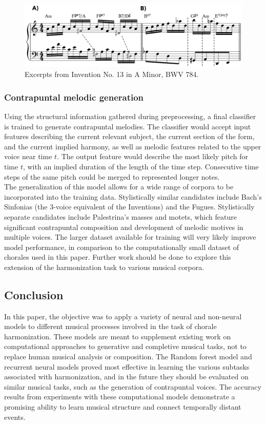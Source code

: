 \documentclass[11pt]{article}
\begin{document}
\begin{figure}[h]
\caption{ Excerpts from Invention No. 13 in A Minor, BWV 784.  }
\centerline{\includegraphics[scale=0.27]{examples/ex2}}
\end{figure}

\subsubsection{Contrapuntal melodic generation}
Using the structural information gathered during preprocessing, a final classifier is trained to generate contrapuntal melodies. The classifier would accept input features describing the current relevant subject, the current section of the form, and the current implied harmony, as well as melodic features related to the upper voice near time $t$. The output feature would describe the most likely pitch for time $t$, with an implied duration of the length of the time step. Consecutive time steps of the same pitch could be merged to represented longer notes. \\
The generalization of this model allows for a wide range of corpora to be incorporated into the training data. Stylistically similar candidates include Bach's Sinfonias (the 3-voice equivalent of the Inventions) and the Fugues. Stylistically separate candidates include Palestrina's masses and motets, which feature significant contrapuntal composition and development of melodic motives in multiple voices. The larger dataset available for training will very likely improve model performance, in comparison to the computationally small dataset of chorales used in this paper. Further work should be done to explore this extension of the harmonization task to various musical corpora.

\newpage

\subsection{Conclusion}

In this paper, the objective was to apply a variety of neural and non-neural models to different musical processes involved in the task of chorale harmonization. These models are meant to supplement existing work on computational approaches to generative and completive musical tasks, not to replace human musical analysis or composition. The Random forest model and recurrent neural models proved most effective in learning the various subtasks associated with harmonization, and in the future they should be evaluated on similar musical tasks, such as the generation of contrapuntal voices. The accuracy results from experiments with these computational models demonstrate a promising ability to learn musical structure and connect temporally distant events.
\end{document}
